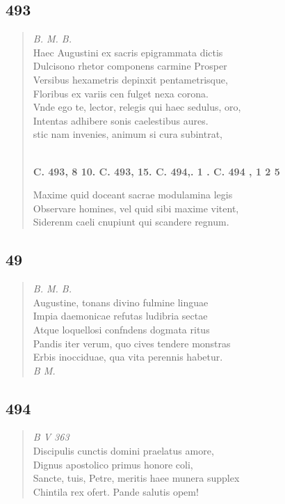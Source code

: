 \documentclass[11pt, a4paper]{report}
\begin{document}
            \subsection*{493}
      \begin{verse}
      \textit{B. M. B.} \\ Haec Augustini ex sacris epigrammata dictis \\ Dulcisono rhetor componens carmine Prosper \\ Versibus hexametris depinxit pentametrisque, \\ Floribus ex variis cen fulget nexa corona. \\ Vnde ego te, lector, relegis qui haec sedulus, oro, \\ Intentas adhibere sonis caelestibus aures. \\ stic nam invenies, animum si cura subintrat, \\ 
        ﻿\pagebreak 
    \begin{center} \textbf{C. 493, 8 10. C. 493, 15. C. 494,. 1 . C. 494 , 1 2 5} \end{center}Maxime quid doceant sacrae modulamina legis \\ Observare homines, vel quid sibi maxime vitent, \\ Siderenm caeli cnupiunt qui scandere regnum. \\ 
      \end{verse}
  
            \subsection*{49}
      \begin{verse}
      \textit{B. M. B.} \\ Augustine, tonans divino fulmine linguae \\ Impia daemonicae refutas ludibria sectae \\ Atque loquellosi confndens dogmata ritus \\ Pandis iter verum, quo cives tendere monstras \\ Erbis inocciduae, qua vita perennis habetur. \\ \textit{B M.} \\ 
      \end{verse}
  
            \subsection*{494}
      \begin{verse}
      \textit{B V 363} \\ Discipulis cunctis domini praelatus amore, \\ Dignus apostolico primus honore coli, \\ Sancte, tuis, Petre, meritis haee munera supplex \\ Chintila rex ofert. Pande salutis opem! \\ 
      \end{verse}
  
\end{document}
